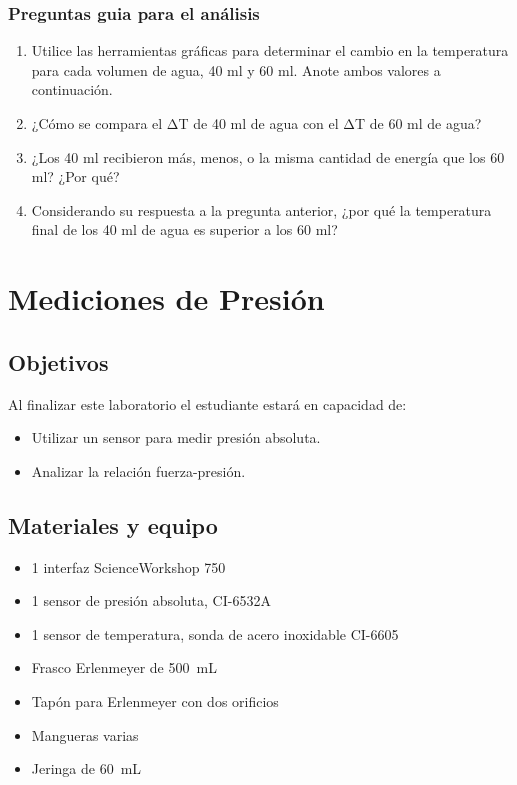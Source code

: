 \documentclass[12pt,letterpaper]{report}
\newcommand{\obj}{Objetivos}
\newcommand{\mat}{Materiales y equipo}
\newcommand{\capacidad}{Al finalizar este laboratorio el estudiante estará en capacidad de:}
\begin{document}
\subsection{Preguntas guia para el análisis}
\begin{enumerate}
    \item Utilice las herramientas gráficas para determinar el cambio en la temperatura para cada volumen de agua, 40 ml y 60 ml. Anote ambos valores a continuación.
    \item ¿Cómo se compara el ΔT de 40 ml de agua con el ΔT de 60 ml de agua?
    \item ¿Los 40 ml recibieron más, menos, o la misma cantidad de energía que los 60 ml? ¿Por qué?
    \item Considerando su respuesta a la pregunta anterior, ¿por qué la temperatura final de los 40 ml de agua es superior a los 60 ml?
\end{enumerate}



\chapter{Mediciones de Presión}
\section{\obj}
\capacidad
\begin{itemize}
\item Utilizar un sensor para medir presión absoluta.
\item Analizar la relación fuerza-presión.
\end{itemize}

\section{\mat}
\begin{itemize}
\item 1 interfaz ScienceWorkshop\,\textregistered\,750
\item 1 sensor de presión absoluta, CI-6532A
\item 1 sensor de temperatura, sonda de acero inoxidable CI-6605
\item Frasco Erlenmeyer de \SI{500}{\milli\liter}
\item Tapón para Erlenmeyer con dos orificios
\item Mangueras varias
\item Jeringa de \SI{60}{\milli\liter}
\end{itemize}
\end{document}
